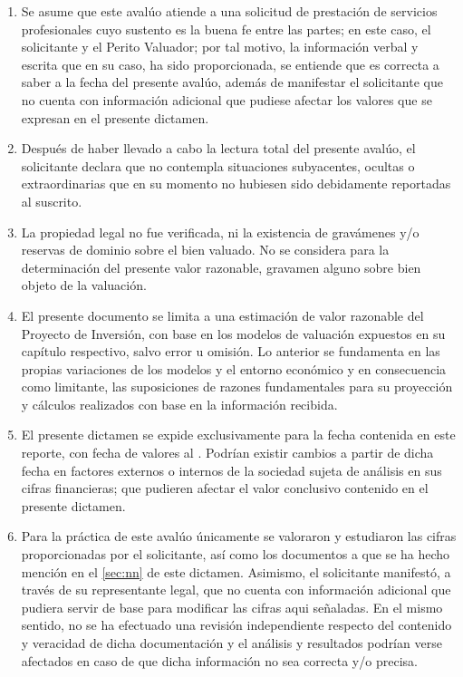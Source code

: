 \begin{enumerate}[\indent a)]
\item Se asume que este aval\'uo atiende a una solicitud de prestaci\'on de servicios profesionales cuyo sustento es la buena fe entre las partes; en este caso, el solicitante y el Perito Valuador; por tal motivo, la informaci\'on verbal y escrita que en su caso, ha sido proporcionada, se entiende que es correcta a saber a la fecha del presente aval\'uo, adem\'as de manifestar el solicitante que no cuenta con informaci\'on adicional  que pudiese afectar los valores que se expresan en el presente dictamen.
\item Despu\'es de haber llevado a cabo la lectura total del presente aval\'uo, el solicitante declara que no contempla situaciones subyacentes, ocultas o extraordinarias que en su momento no hubiesen sido debidamente reportadas al suscrito.
\item La propiedad legal no fue verificada, ni la existencia de grav\'amenes y/o reservas de dominio sobre el bien valuado. No se considera para la determinaci\'on del presente valor razonable, gravamen alguno sobre bien objeto de la valuaci\'on.
\item El presente documento se limita a una estimaci\'on de valor razonable del \textcolor{principal}{Proyecto de Inversi\'on}, con base en los modelos de valuaci\'on expuestos en su cap\'itulo respectivo, salvo error u omisi\'on. Lo anterior se fundamenta en las propias variaciones de los modelos y el entorno econ\'omico y en consecuencia como limitante, las suposiciones de razones fundamentales para su proyecci\'on y c\'alculos realizados con base en la informaci\'on recibida.


\item El presente dictamen se expide exclusivamente para la fecha contenida en este reporte, con fecha de valores  al \textcolor{principal}{\fechaValores}. Podr\'ian existir cambios a partir de dicha fecha en factores externos o internos de la sociedad sujeta de an\'alisis en sus cifras financieras; que pudieren afectar el valor conclusivo contenido en el presente dictamen.

\item Para la pr\'actica de este aval\'uo \'unicamente se valoraron y estudiaron las cifras proporcionadas por el solicitante, as\'i como los documentos a que se ha hecho menci\'on en el \autoref{sec:nn} de este dictamen. Asimismo, el solicitante manifest\'o, a trav\'es de su representante legal, que no cuenta con informaci\'on adicional que pudiera servir de base para modificar las cifras aqui se\~naladas. En el mismo sentido, no se ha efectuado una revisi\'on independiente respecto del contenido y veracidad de dicha documentaci\'on y el an\'alisis y resultados podr\'ian verse afectados en caso de que dicha informaci\'on no sea correcta y/o precisa.


\end{enumerate}
